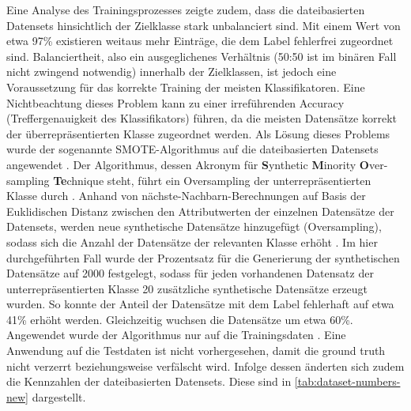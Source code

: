 \label{smote}
Eine Analyse des Trainingsprozesses zeigte zudem, dass die dateibasierten Datensets hinsichtlich der Zielklasse stark unbalanciert sind. Mit einem Wert von etwa 97\% existieren weitaus mehr Einträge, die dem Label \glqq fehlerfrei\grqq{} zugeordnet sind. Balanciertheit, also ein ausgeglichenes Verhältnis (50:50 ist im binären Fall nicht zwingend notwendig) innerhalb der Zielklassen, ist jedoch eine Voraussetzung für das korrekte Training der meisten Klassifikatoren. Eine Nichtbeachtung dieses Problem kann zu einer irreführenden Accuracy (Treffergenauigkeit des Klassifikators) führen, da die meisten Datensätze korrekt der überrepräsentierten Klasse zugeordnet werden. Als Lösung dieses Problems wurde der sogenannte SMOTE-Algorithmus auf die dateibasierten Datensets angewendet \cite{Chawla2002}. Der Algorithmus, dessen Akronym für \textbf{S}ynthetic \textbf{M}inority \textbf{O}ver-sampling \textbf{Te}chnique steht, führt ein Oversampling der unterrepräsentierten Klasse durch \cite{Chawla2002}. Anhand von nächste-Nachbarn-Berechnungen auf Basis der Euklidischen Distanz zwischen den Attributwerten der einzelnen Datensätze der Datensets, werden neue synthetische Datensätze hinzugefügt (Oversampling), sodass sich die Anzahl der Datensätze der relevanten Klasse erhöht \cite{Chawla2002}. Im hier durchgeführten Fall wurde der Prozentsatz für die Generierung der synthetischen Datensätze auf 2000 festgelegt, sodass für jeden vorhandenen Datensatz der unterrepräsentierten Klasse 20 zusätzliche synthetische Datensätze erzeugt wurden. So konnte der Anteil der Datensätze mit dem Label \glqq fehlerhaft\grqq{} auf etwa 41\% erhöht werden. Gleichzeitig wuchsen die Datensätze um etwa 60\%. Angewendet wurde der Algorithmus nur auf die Trainingsdaten \cite{Chawla2002} . Eine Anwendung auf die Testdaten ist nicht vorhergesehen, damit die \glqq ground truth\grqq{} nicht verzerrt beziehungsweise verfälscht wird. Infolge dessen änderten sich zudem die Kennzahlen der dateibasierten Datensets. Diese sind in \autoref{tab:dataset-numbers-new} dargestellt.

